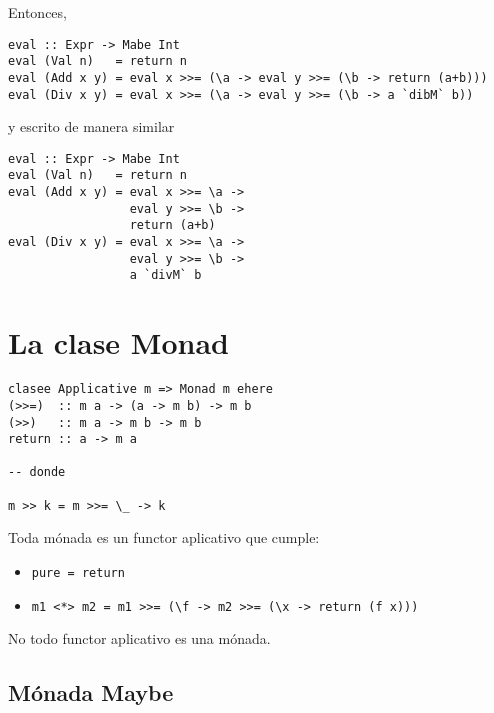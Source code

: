 \documentclass{article}
\newcommand{\imp}[1]{\textcolor{color1}{#1}}
\begin{document}
Entonces,

\begin{lstlisting}
eval :: Expr -> Mabe Int
eval (Val n)   = return n
eval (Add x y) = eval x >>= (\a -> eval y >>= (\b -> return (a+b)))
eval (Div x y) = eval x >>= (\a -> eval y >>= (\b -> a `dibM` b))
\end{lstlisting}

y escrito de manera similar

\begin{lstlisting}
eval :: Expr -> Mabe Int
eval (Val n)   = return n
eval (Add x y) = eval x >>= \a -> 
                 eval y >>= \b -> 
                 return (a+b)
eval (Div x y) = eval x >>= \a -> 
                 eval y >>= \b -> 
                 a `divM` b
\end{lstlisting}

\section{La clase Monad}

\begin{lstlisting}
clasee Applicative m => Monad m ehere
(>>=)  :: m a -> (a -> m b) -> m b
(>>)   :: m a -> m b -> m b
return :: a -> m a

-- donde

m >> k = m >>= \_ -> k
\end{lstlisting}

Toda mónada es un functor aplicativo que cumple:

\begin{itemize}
\item[]

\begin{lstlisting}
pure = return
\end{lstlisting}

\item[]

\begin{lstlisting}
m1 <*> m2 = m1 >>= (\f -> m2 >>= (\x -> return (f x)))
\end{lstlisting}
\end{itemize}

No todo \imp{functor aplicativo} es una \imp{mónada}.

\subsection{Mónada Maybe}
\end{document}
